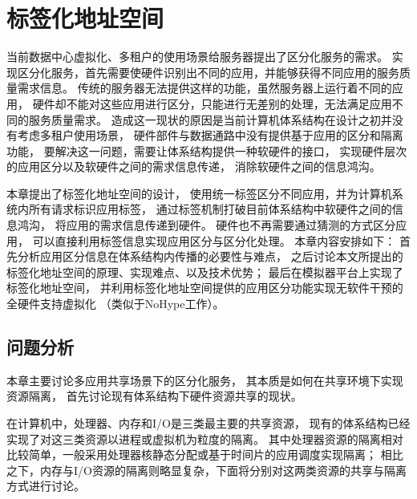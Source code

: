

\chapter{标签化地址空间}
\label{chap:labeladdrspace}

当前数据中心虚拟化、多租户的使用场景给服务器提出了区分化服务的需求。
实现区分化服务，首先需要使硬件识别出不同的应用，并能够获得不同应用的服务质量需求信息。
传统的服务器无法提供这样的功能，虽然服务器上运行着不同的应用，
硬件却不能对这些应用进行区分，只能进行无差别的处理，无法满足应用不同的服务质量需求。
造成这一现状的原因是当前计算机体系结构在设计之初并没有考虑多租户使用场景，
硬件部件与数据通路中没有提供基于应用的区分和隔离功能，
要解决这一问题，需要让体系结构提供一种软硬件的接口，
实现硬件层次的应用区分以及软硬件之间的需求信息传递，
消除软硬件之间的信息鸿沟。

本章提出了标签化地址空间的设计，
使用统一标签区分不同应用，并为计算机系统内所有请求标识应用标签，
通过标签机制打破目前体系结构中软硬件之间的信息鸿沟，
将应用的需求信息传递到硬件。
硬件也不再需要通过猜测的方式区分应用，
可以直接利用标签信息实现应用区分与区分化处理。
本章内容安排如下：
首先分析应用区分信息在体系结构内传播的必要性与难点，
之后讨论本文所提出的标签化地址空间的原理、实现难点、以及技术优势； 
最后在模拟器平台上实现了标签化地址空间，
并利用标签化地址空间提供的应用区分功能实现无软件干预的全硬件支持虚拟化
（类似于NoHype工作\cite{keller_nohype:_2010}）。

%
%
% 
%

\section{问题分析}

本章主要讨论多应用共享场景下的区分化服务，
其本质是如何在共享环境下实现资源隔离，
首先讨论现有体系结构下硬件资源共享的现状。

在计算机中，处理器、内存和I/O是三类最主要的共享资源，
现有的体系结构已经实现了对这三类资源以进程或虚拟机为粒度的隔离。
其中处理器资源的隔离相对比较简单，一般采用处理器核静态分配或基于时间片的应用调度实现隔离；
相比之下，内存与I/O资源的隔离则略显复杂，下面将分别对这两类资源的共享与隔离方式进行讨论。

